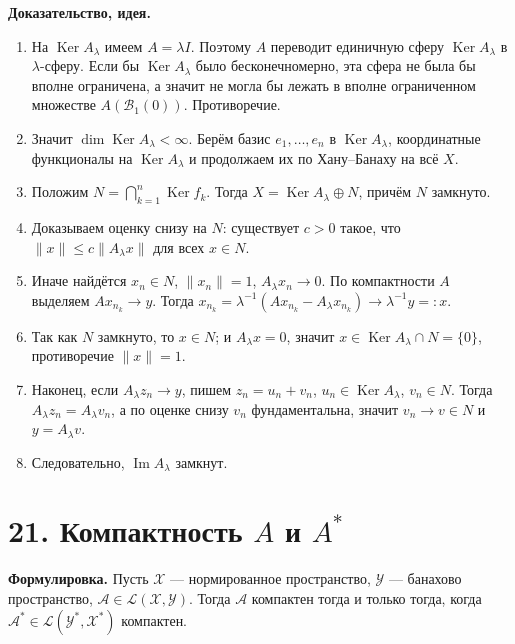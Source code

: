 \documentclass[10pt,a4paper]{article}
\newcommand{\X}{X}
\newcommand{\Ker}{\operatorname{Ker}}
\begin{document}
	\textbf{Доказательство, идея.}
	\begin{enumerate}
		\item На $\Ker A_\lambda$ имеем $A=\lambda I$. Поэтому $A$ переводит единичную сферу $\Ker A_\lambda$ в $\lambda$-сферу. Если бы $\Ker A_\lambda$ было бесконечномерно, эта сфера не была бы вполне ограничена, а значит не могла бы лежать в вполне ограниченном множестве $A(\mathcal B_1(0))$. Противоречие.
		\item Значит $\dim\Ker A_\lambda<\infty$. Берём базис $e_1,\dots,e_n$ в $\Ker A_\lambda$, координатные функционалы на $\Ker A_\lambda$ и продолжаем их по Хану--Банаху на всё $\X$.
		\item Положим $N=\bigcap_{k=1}^n\Ker f_k$. Тогда $\X=\Ker A_\lambda\oplus N$, причём $N$ замкнуто.
		\item Доказываем оценку снизу на $N$: существует $c>0$ такое, что $\|x\|\le c\|A_\lambda x\|$ для всех $x\in N$.
		\item Иначе найдётся $x_n\in N$, $\|x_n\|=1$, $A_\lambda x_n\to0$. По компактности $A$ выделяем $Ax_{n_k}\to y$. Тогда $x_{n_k}=\lambda^{-1}(Ax_{n_k}-A_\lambda x_{n_k})\to \lambda^{-1}y=:x$.
		\item Так как $N$ замкнуто, то $x\in N$; и $A_\lambda x=0$, значит $x\in\Ker A_\lambda\cap N=\{0\}$, противоречие $\|x\|=1$.
		\item Наконец, если $A_\lambda z_n\to y$, пишем $z_n=u_n+v_n$, $u_n\in\Ker A_\lambda$, $v_n\in N$. Тогда $A_\lambda z_n=A_\lambda v_n$, а по оценке снизу $v_n$ фундаментальна, значит $v_n\to v\in N$ и $y=A_\lambda v$.
		\item Следовательно, $\operatorname{Im}A_\lambda$ замкнут.

	\end{enumerate}

	\section*{21. Компактность $A$ и $A^\ast$}
	\textbf{Формулировка.} Пусть $\mathcal X$ --- нормированное пространство, $\mathcal Y$ --- банахово пространство, $\mathcal A\in\mathcal L(\mathcal X,\mathcal Y)$. Тогда $\mathcal A$ компактен тогда и только тогда, когда $\mathcal A^*\in\mathcal L(\mathcal Y^*,\mathcal X^*)$ компактен.
\end{document}
